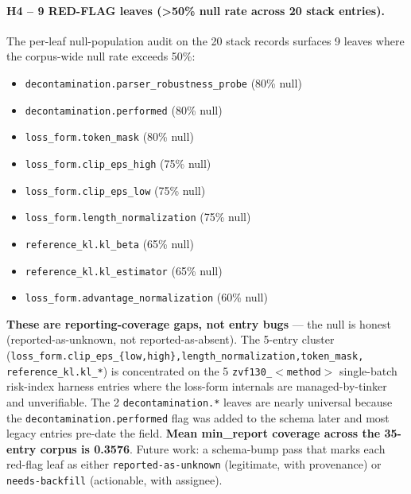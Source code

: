 \paragraph{H4 -- 9 RED-FLAG leaves (>50\% null rate across 20 stack entries).}
The per-leaf null-population audit on the 20 stack records surfaces 9 leaves
where the corpus-wide null rate exceeds 50\%:
\begin{itemize}\itemsep0pt
\item \texttt{decontamination.parser\_robustness\_probe} (80\% null)
\item \texttt{decontamination.performed} (80\% null)
\item \texttt{loss\_form.token\_mask} (80\% null)
\item \texttt{loss\_form.clip\_eps\_high} (75\% null)
\item \texttt{loss\_form.clip\_eps\_low} (75\% null)
\item \texttt{loss\_form.length\_normalization} (75\% null)
\item \texttt{reference\_kl.kl\_beta} (65\% null)
\item \texttt{reference\_kl.kl\_estimator} (65\% null)
\item \texttt{loss\_form.advantage\_normalization} (60\% null)
\end{itemize}
\textbf{These are reporting-coverage gaps, not entry bugs} --- the null is
honest (reported-as-unknown, not reported-as-absent). The 5-entry cluster
(\texttt{loss\_form.clip\_eps\_\{low,high\},length\_normalization,token\_mask,
reference\_kl.kl\_*}) is concentrated on the 5 \texttt{zvf130\_$<$method$>$}
single-batch risk-index harness entries where the loss-form internals are
managed-by-tinker and unverifiable. The 2 \texttt{decontamination.*} leaves are
nearly universal because the \texttt{decontamination.performed} flag was added
to the schema later and most legacy entries pre-date the field. \textbf{Mean
min\_report coverage across the 35-entry corpus is 0.3576}. Future work: a
schema-bump pass that marks each red-flag leaf as either
\texttt{reported-as-unknown} (legitimate, with provenance) or
\texttt{needs-backfill} (actionable, with assignee).

